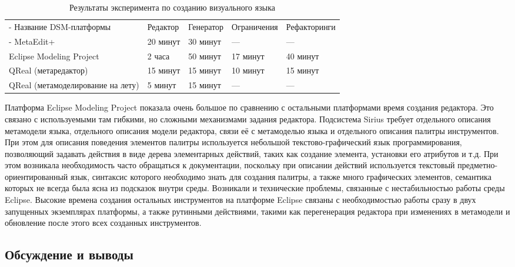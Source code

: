 \begin{table}[ht]
	\begin{longtabu} {| X[1 l p] | X[1 l p] | X[1 l p] | X[1 l p] |X[1 l p] |}
		\caption{Результаты эксперимента по созданию визуального языка} \\
		\tabucline-
		 Название DSM-платформы           & Редактор  & Генератор  & Ограничения  & Рефакторинги  \\
		\tabucline-
		\everyrow{\tabucline-}
		MetaEdit+                         & 20 минут  & 30 минут   & ---          & ---           \\
		Eclipse Modeling Project          & 2 часа    & 50 минут   & 17 минут     & 40 минут      \\
		QReal (метаредактор)              & 15 минут  & 15 минут   & 10 минут     & 15 минут      \\
		QReal (метамоделирование на лету) & 5 минут   & 15 минут   & ---          & ---
		\label{tab:experiment}
	\end{longtabu}
\end{table}

Платформа Eclipse Modeling Project показала очень большое по сравнению с остальными
платформами время создания редактора. Это связано с используемыми там гибкими, но
сложными механизмами задания редактора. Подсистема Sirius требует отдельного
описания метамодели языка, отдельного описания модели редактора, связи её с метамоделью языка
и отдельного описания палитры инструментов. При этом для описания поведения элементов палитры
используется небольшой текстово-графический язык программирования, позволяющий задавать действия
в виде дерева элементарных действий, таких как создание элемента, установки его атрибутов
и т.д. При этом возникала необходимость часто обращаться к документации, поскольку
при описании действий используется текстовый предметно-ориентированный язык, синтаксис
которого необходимо знать для создания палитры, а также много графических элементов,
семантика которых не всегда была ясна из подсказок внутри среды. Возникали и технические проблемы,
связанные с нестабильностью работы среды Eclipse. Высокие времена создания остальных
инструментов на платформе Eclipse связаны с необходимостью работы сразу в двух запущенных
экземплярах платформы, а также рутинными действиями, такими как перегенерация редактора
при изменениях в метамодели и обновление после этого всех созданных инструментов.

\subsection{Обсуждение и выводы}
